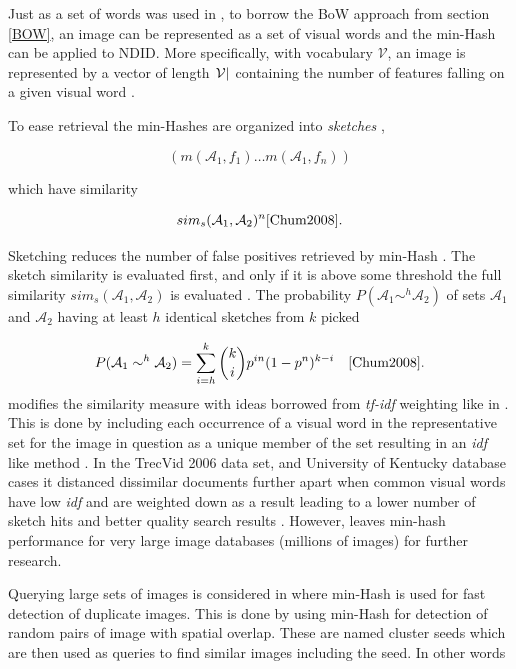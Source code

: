 \documentclass[english,12pt,a4paper,pdftex,elec,utf8]{aaltothesis}
\begin{document}
Just as a set of words was used in \cite{Broder1997}, to borrow the BoW approach from section \ref{BOW}, an image can be represented as a set of visual words and the min-Hash can be applied to NDID. More specifically, with vocabulary $\mathcal{V}$, an image is represented by a vector of length $\abs{\mathcal{V}}$ containing the number of features falling on a given visual word \cite{Chum2008}.

To ease retrieval the min-Hashes are organized into \emph{sketches} \cite{Chum2008}, \cite{Broder1997}

\begin{equation}\label{sketch}
(m(\mathcal{A_1},f_1) \ldots m(\mathcal{A_1},f_n))
\end{equation}

which have similarity

\begin{equation}\label{sketchsim}
sim_s(\mathcal{A}_1, \mathcal{A}_2)^n \cite{Chum2008}.
\end{equation}

Sketching reduces the number of false positives retrieved by min-Hash \cite{Chum2008}. The sketch similarity is evaluated first, and only if it is above some threshold the full similarity $sim_s(\mathcal{A}_1, \mathcal{A}_2)$ is evaluated \cite{Chum2008}. The probability $P(\mathcal{A}_1 \sim^h \mathcal{A}_2)$ of sets $\mathcal{A}_1$ and $\mathcal{A}_2$ having at least $h$ identical sketches from $k$ picked

\begin{equation} \label{sketchsimilarityprob}
P(\mathcal{A}_1 \sim^h \mathcal{A}_2) = \sum_{i=h}^k \binom{k}{i} p^{in}(1-p^n)^{k-i} \quad \cite{Chum2008}.
\end{equation}
\cite{Chum2008} modifies the similarity measure with ideas borrowed from \emph{tf-idf} weighting like in \cite{Sivic2003}. This is done by including each occurrence of a visual word in the representative set for the image in question as a unique member of the set resulting in an \emph{idf} like method \cite{Chum2010}. In the TrecVid 2006 data set, and University of Kentucky database cases it distanced dissimilar documents further apart when common visual words have low \emph{idf} and are weighted down as a result leading to a lower number of sketch hits and better quality search results \cite{Chum2008}. However, \cite{Chum2008} leaves min-hash performance for very large image databases (millions of images) for further research.

Querying large sets of images is considered in \cite{Chum2010} where min-Hash is used for fast detection of duplicate images. This is done by using min-Hash for detection of random pairs of image with spatial overlap. These are named cluster seeds which are then used as queries to find similar images including the seed. In other words
\end{document}
